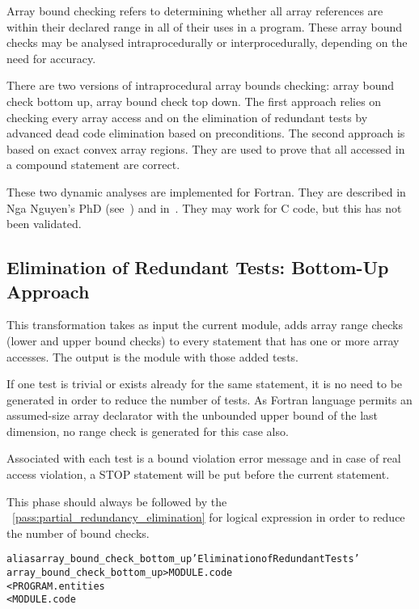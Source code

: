 \documentclass[a4paper]{report}
\newenvironment{PipsMake}{\begin{alltt}}{\end{alltt}}
\newcommand{\PipsPassRef}[1]{\texttt{\detokenize{#1}}~\ref{pass:#1}}
\newenvironment{PipsPass}[1]{\label{pass:#1}}{}
\begin{document}
Array bound checking refers to determining whether all array references
are within their declared range in all of their uses in a program. These
array  bound checks may be analysed intraprocedurally or
interprocedurally, depending on the need for accuracy.

There are two versions of intraprocedural array bounds checking: array
bound check bottom up, array bound check top down. The first approach
relies on checking every array access and on the elimination of
redundant tests by advanced dead code elimination based on
preconditions. The second approach is based on exact convex array
regions. They are used to prove that all accessed in a compound
statement are correct.

These two dynamic analyses are implemented for Fortran. They are
described in Nga Nguyen's PhD (see~\cite{Ngu02}) and in~\cite{NI05}. They
may work for C code, but this has not been validated.


\subsection{Elimination of Redundant Tests: Bottom-Up Approach}
\label{subsection-array-bound-check_bottom_up}

\begin{PipsPass}{array_bound_check_bottom_up}
This transformation takes as input the current module, adds array range
checks (lower and upper bound checks) to every statement that has one or
more array accesses. The output is the module with those added tests.

If one test is trivial or exists already for the same statement, it is
no need to be generated in order to reduce the
number of tests.  As Fortran language permits an assumed-size array
declarator with the unbounded upper bound of the last dimension, no range check is generated for this case also.

Associated with each test is a bound violation error message and in case
of real access violation, a STOP statement will be put before the current
statement.

This phase should always be followed by the
\PipsPassRef{partial_redundancy_elimination} for logical expression in
order to reduce the number of bound checks.
\end{PipsPass}

\begin{PipsMake}
alias array_bound_check_bottom_up 'Elimination of Redundant Tests'
array_bound_check_bottom_up            > MODULE.code
        < PROGRAM.entities
        < MODULE.code
\end{PipsMake}
\end{document}
